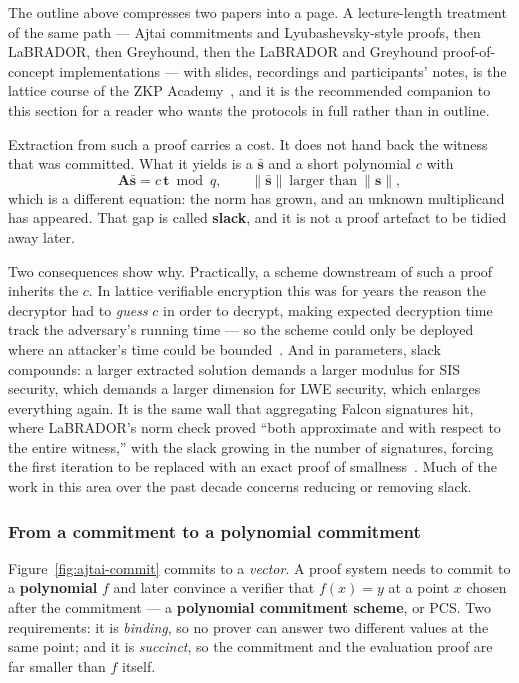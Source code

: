 The outline above compresses two papers into a page. A lecture-length treatment
of the same path --- Ajtai commitments and Lyubashevsky-style proofs, then
LaBRADOR, then Greyhound, then the LaBRADOR and Greyhound proof-of-concept
implementations --- with slides, recordings and participants' notes, is the
lattice course of the ZKP Academy~\cite{zkpacademylattice}, and it is the
recommended companion to this section for a reader who wants the protocols in
full rather than in outline.

Extraction from such a proof carries a cost. It does not hand back the witness
that was committed. What it yields is a
$\bar{\mathbf{s}}$ and a short polynomial $c$ with
\[
  \mathbf{A}\bar{\mathbf{s}} = c\,\mathbf{t} \bmod q,
  \qquad \|\bar{\mathbf{s}}\| \ \text{larger than}\ \|\mathbf{s}\| ,
\]
which is a different equation: the norm has grown, and an unknown multiplicand
has appeared. That gap is called \textbf{slack}, and it is not a proof artefact
to be tidied away later.

Two consequences show why. Practically, a scheme downstream of such a proof
inherits the $c$. In lattice verifiable encryption this was for years the reason
the decryptor had to \emph{guess} $c$ in order to decrypt, making expected
decryption time track the adversary's running time --- so the scheme could only
be deployed where an attacker's time could be bounded~\cite{lnp2022}. And in
parameters, slack compounds: a larger extracted solution demands a larger modulus
for SIS security, which demands a larger dimension for LWE security, which
enlarges everything again. It is the same wall that aggregating Falcon signatures
hit, where LaBRADOR's norm check proved ``both approximate and with respect to
the entire witness,'' with the slack growing in the number of signatures, forcing
the first iteration to be replaced with an exact proof of
smallness~\cite{falconagg2024}. Much of the work in this area over the past
decade concerns reducing or removing slack.

\subsubsection{From a commitment to a polynomial commitment}
Figure~\ref{fig:ajtai-commit} commits to a \emph{vector}. A proof system needs
to commit to a \textbf{polynomial} $f$ and later convince a verifier that
$f(x)=y$ at a point $x$ chosen after the commitment --- a \textbf{polynomial
commitment scheme}, or PCS. Two requirements: it is \emph{binding}, so no prover
can answer two different values at the same point; and it is \emph{succinct}, so
the commitment and the evaluation proof are far smaller than $f$ itself.

